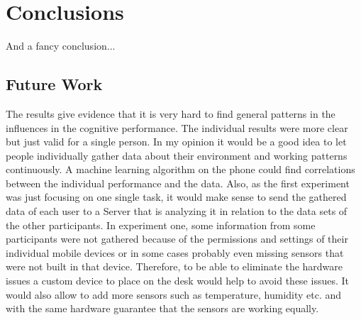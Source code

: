 \chapter{Conclusions}

And a fancy conclusion...


\section{Future Work}
The results give evidence that it is very hard to find general patterns in the influences in the cognitive performance. The individual results were more clear but just valid for a single person. 
In my opinion it would be a good idea to let people individually gather data about their environment and working patterns continuously. A machine learning algorithm on the phone could find correlations between the individual performance and the data. Also, as the first experiment was just focusing on one single task, it would make sense to send the gathered data of each user to a Server that is analyzing it in relation to the data sets of the other participants. 
In experiment one, some information from some participants were not gathered because of the permissions and settings of their individual mobile devices or in some cases probably even missing sensors that were not built in that device. 
Therefore, to be able to eliminate the hardware issues a custom device to place on the desk would help to avoid these issues. It would also allow to add more sensors such as temperature, humidity etc. and with the same hardware guarantee that the sensors are working equally. 